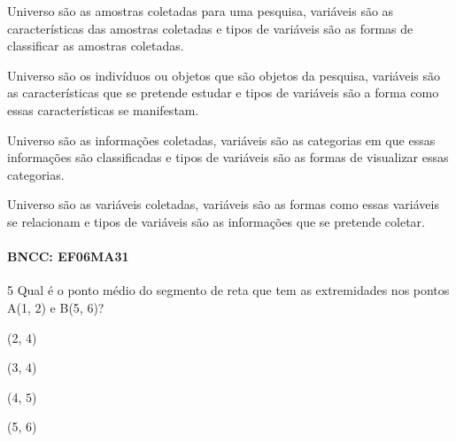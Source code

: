 \begin{escolha}
\item Universo são as amostras coletadas para uma pesquisa, variáveis são
as características das amostras coletadas e tipos de variáveis são as
formas de classificar as amostras coletadas.
\item Universo são os indivíduos ou objetos que são objetos da pesquisa,
variáveis são as características que se pretende estudar e tipos de
variáveis são a forma como essas características se manifestam.
\item Universo são as informações coletadas, variáveis são as categorias em
que essas informações são classificadas e tipos de variáveis são as
formas de visualizar essas categorias.
\item Universo são as variáveis coletadas, variáveis são as formas como
essas variáveis se relacionam e tipos de variáveis são as informações
que se pretende coletar.
\end{escolha}

\paragraph{BNCC: EF06MA31}


\num{5}  Qual é o ponto médio do segmento de reta que tem as extremidades nos
pontos A(1, $2$) e B(5, $6$)?

\begin{escolha}
\item (2, $4$)
\item (3, $4$)
\item (4, $5$)
\item (5, $6$)
\end{escolha}


